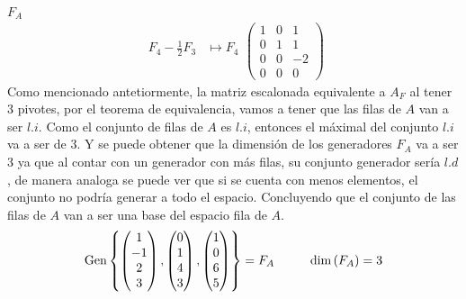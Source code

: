 \begin{mathcase}{\(F_A\)}
\[\begin{aligned}
                \begin{aligned}
                    F_4 - \frac{1}{2}F_3 &\mapsto F_4 \\
                \end{aligned}
                \begin{pmatrix}
                    1 & 0 & 1 \\
                    0 & 1 & 1 \\
                    0 & 0 & -2 \\
                    0 & 0 & 0
                \end{pmatrix}
            \end{aligned}
        \]
        Como mencionado antetiormente, la matriz escalonada equivalente a \(A_F\) al tener 3 pivotes, por el teorema de equivalencia, vamos a tener que las filas de \(A\) van a ser \(l.i\).
        Como el conjunto de filas de \(A\) es \(l.i\), entonces el máximal del conjunto \(l.i\) va a ser de 3. Y se puede obtener que la dimensión de los generadores \(F_A\) va a ser 
        3 ya que al contar con un generador con más filas, su conjunto generador sería \(l.d\), de manera analoga se puede ver que si se cuenta con menos elementos, el conjunto no podría generar a todo el espacio. 
        Concluyendo que el conjunto de las filas de \(A\) van a ser una base del espacio fila de \(A\).
        \[
            \text{Gen} \left\{ 
                \begin{pmatrix}
                    1 \\ -1 \\ 2 \\ 3
                \end{pmatrix},
                \begin{pmatrix}
                    0 \\ 1 \\ 4 \\ 3 
                \end{pmatrix},
                \begin{pmatrix}
                    1 \\ 0 \\ 6 \\ 5
                \end{pmatrix}
             \right\}
            =
            F_A
            \hspace{1cm}
            \text{dim} \left( F_A \right) = 3 
        \]
    \end{mathcase}
